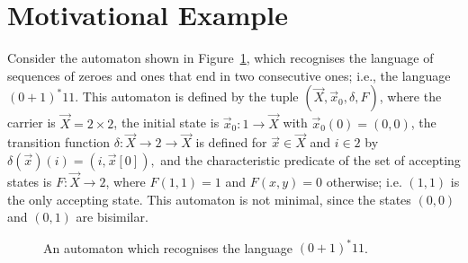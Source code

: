 \section{Motivational Example}
\label{sec:Latent:Motivation}
Consider the automaton shown in Figure~\ref{fig:ExampleLatent}, which recognises the language of sequences of zeroes and ones that end in two consecutive ones; i.e., the language $(0+1)^*11$. 
This automaton is defined by the tuple $(\vec{X},\vec{x}_0,\delta,F)$, where the carrier is $\vec{X}=2\times2$, the initial state is $\vec{x}_0\colon1\rightarrow \vec{X}$ with $\vec{x}_0(0)=(0,0)$, the transition function $\delta\colon \vec{X}\rightarrow 2\rightarrow\vec{X}$ is defined for $\vec{x}\in \vec{X}$ and $i \in 2$ by $\delta(\vec{x})(i)=(i,\vec{x}[0]),$ and the characteristic predicate of the set of accepting states is $F\colon\vec{X}\rightarrow 2$, where $F(1,1)=1$ and $F(x,y)=0$ otherwise; i.e. $(1,1)$ is the only accepting state. This automaton is not minimal, since the states $(0,0)$ and $(0,1)$ are bisimilar.

\begin{figure}[t]
    \centering
    \caption{An automaton which recognises the language $(0+1)^*11$.}
    \label{fig:ExampleLatent}
\end{figure}

